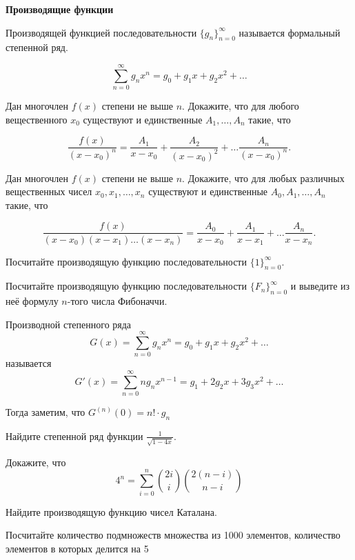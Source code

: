 \documentclass{article}
\begin{document}
    \large


    \begin{center}
        \textbf{Производящие функции}
    \end{center}

    Производящей функцией последовательности $\{g_n\}_{n = 0}^{\infty}$ называется формальный степенной ряд.

    \[\sum_{n = 0}^{\infty}g_{n}x^n = g_0 + g_{1}x + g_{2}x^2 + \dotsc\]
    \begin{enumerate_boxed}

        \item Дан многочлен $f(x)$ степени не выше $n$.
        Докажите, что для любого вещественного $x_0$ существуют и единственные $A_1, \dotsc , A_n$ такие, что

        \[\frac{f(x)}{(x - x_0)^n} = \frac{A_1}{x-x_0} + \frac{A_2}{(x-x_0)^2} + \dotsc \frac{A_n}{(x-x_0)^n}.\]

        \item Дан многочлен $f(x)$ степени не выше $n$.
        Докажите, что для любых различных вещественных чисел $x_0, x_1, \dotsc, x_n$ существуют и единственные $A_0, A_1, \dotsc , A_n$ такие, что

        \[\frac{f(x)}{(x - x_0)(x-x_1)\dotsc(x-x_n)} = \frac{A_0}{x-x_0} + \frac{A_1}{x-x_1} + \dotsc \frac{A_n}{x-x_n}.\]

        \item Посчитайте производящую функцию последовательности $\{1\}_{n = 0}^{\infty}$.

        \item Посчитайте производящую функцию последовательности $\{F_n\}_{n = 0}^{\infty}$ и выведите из неё формулу $n$-того числа Фибоначчи.

        Производной степенного ряда
        \[G(x) = \sum_{n = 0}^{\infty}g_{n}x^n = g_0 + g_{1}x + g_{2}x^2 + \dotsc\]
        называется
        \[G'(x) = \sum_{n = 0}^{\infty}ng_{n}x^{n-1} = g_1 + 2g_{2}x + 3g_{3}x^2 + \dotsc\]

        Тогда заметим, что $G^{(n)}(0) = n! \cdot g_n$

        \item Найдите степенной ряд функции $\frac{1}{\sqrt{1 - 4x}}$.

        \item Докажите, что \[4^n = \sum_{i = 0}^n \binom{2i}{i} \binom{2(n-i)}{n-i}\]

        \item Найдите производящую функцию чисел Каталана.

        \item Посчитайте количество подмножеств множества из 1000 элементов, количество элементов в которых делится на 5


    \end{enumerate_boxed}
\end{document}
